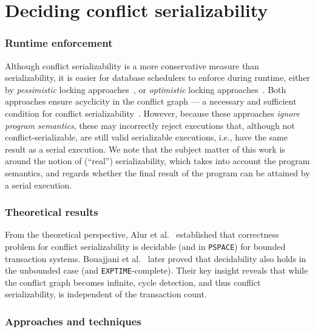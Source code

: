 


\section{Deciding conflict serializability}

\subsubsection{Runtime enforcement}
Although conflict serializability is a more conservative measure than 
serializability, it is easier for database schedulers to enforce during 
runtime, either by \textit{pessimistic} locking approaches~\cite{BeHaGo87}, or 
\textit{optimistic} locking 
approaches~\cite{KuRo81, BuMo06}.
%
Both approaches ensure acyclicity in the conflict graph --- a necessary and 
sufficient condition for conflict serializability~\cite{SiMa10}. However, 
because these approaches \textit{ignore program semantics}, these may 
incorrectly reject executions that, although not conflict-serializable, are 
still valid serializable executions, i.e., have the same result as a serial 
execution. 
%
We note that the subject matter of this work is around the notion of (``real'') 
serializability, which takes 
into account the program semantics, and regards whether the final result of the 
program can be attained by a serial execution.
%

\subsubsection{Theoretical results}
From the theoretical perspective, Alur et al.~\cite{AlMcPe96} established that 
correctness problem for conflict serializability is decidable (and in 
\texttt{PSPACE}) 
for bounded transaction systems. Bouajjani et al.~\cite{BoEmEnHa13} later 
proved that decidability also holds in the unbounded case (and 
\texttt{EXPTIME}-complete). Their key insight reveals that while the conflict 
graph 
becomes infinite, cycle detection, and thus conflict serializability, is 
independent of the transaction count. 
%
%
\subsubsection{Approaches and techniques}

